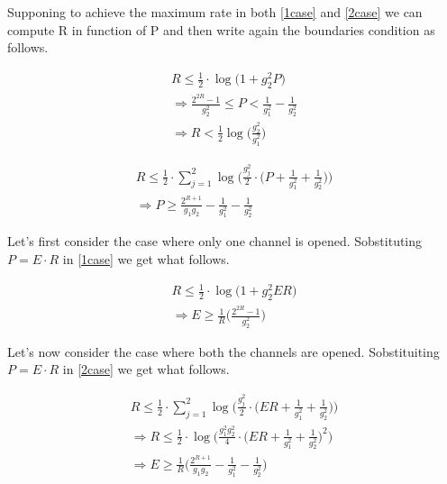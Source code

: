 Supponing to achieve the maximum rate in both \eqref{1case} and \eqref{2case} we can compute R in function of P and then write again the boundaries condition as follows.

\begin{equation}
	\begin{gathered}
		R \leq \frac{1}{2} \cdot \log\big( 1 + g_2^2P \big) \\
		\Rightarrow \frac{2^{2R}-1}{g_2^2} \leq P < \frac{1}{g_1^2} - \frac{1}{g_2^2} \\
		\Rightarrow R < \frac{1}{2} \log\Big(\frac{g_2^2}{g_1^2}\Big)
	\end{gathered}
	\label{bound1}
\end{equation}

\begin{equation}
	\begin{gathered}
		R \leq \frac{1}{2} \cdot \sum_{j=1}^2 \log\Big(\frac{g_j^2}{2} \cdot \Big(P+\frac{1}{g_1^2} + \frac{1}{g_2^2}\Big)\Big) \\
		\Rightarrow P \geq \frac{2^{R+1}}{g_1g_2} -\frac{1}{g_1^2} - \frac{1}{g_2^2}
	\end{gathered}
	\label{bound2}
\end{equation}


Let's first consider the case where only one channel is opened. Sobstituting $P=E \cdot R$ in \eqref{1case} we get what follows.

\begin{equation}
	\begin{gathered}
		R \leq \frac{1}{2} \cdot \log\big( 1 + g_2^2 E R \big) \\
		\Rightarrow E \geq \frac{1}{R}\Big(\frac{2^{2R}-1}{g_2^2}\Big)
	\end{gathered}
\end{equation}

Let's now consider the case where both the channels are opened. Sobstituiting $P=E \cdot R$ in \eqref{2case} we get what follows.

\begin{equation}
	\begin{gathered}
		R \leq \frac{1}{2} \cdot \sum_{j=1}^2 \log\Big(\frac{g_j^2}{2} \cdot \Big(ER+\frac{1}{g_1^2} + \frac{1}{g_2^2}\Big)\Big) \\
		\Rightarrow R \leq \frac{1}{2} \cdot \log\Big(\frac{g_1^2 g_2^2}{4} \cdot \Big(ER+\frac{1}{g_1^2} + \frac{1}{g_2^2}\Big)^2\Big) \\
		\Rightarrow E \geq \frac{1}{R} \Big(\frac{2^{R+1}}{g_1g_2} -\frac{1}{g_1^2} - \frac{1}{g_2^2} \Big)
	\end{gathered}
\end{equation}

